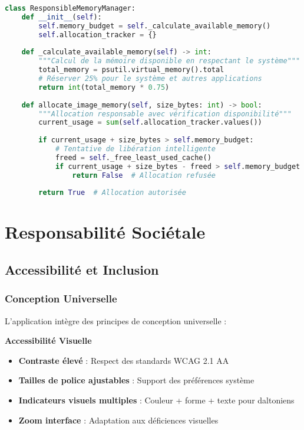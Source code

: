 \documentclass[12pt,a4paper]{report}
\begin{document}
\begin{lstlisting}[language=Python]
class ResponsibleMemoryManager:
    def __init__(self):
        self.memory_budget = self._calculate_available_memory()
        self.allocation_tracker = {}
        
    def _calculate_available_memory(self) -> int:
        """Calcul de la mémoire disponible en respectant le système"""
        total_memory = psutil.virtual_memory().total
        # Réserver 25% pour le système et autres applications
        return int(total_memory * 0.75)
    
    def allocate_image_memory(self, size_bytes: int) -> bool:
        """Allocation responsable avec vérification disponibilité"""
        current_usage = sum(self.allocation_tracker.values())
        
        if current_usage + size_bytes > self.memory_budget:
            # Tentative de libération intelligente
            freed = self._free_least_used_cache()
            if current_usage + size_bytes - freed > self.memory_budget:
                return False  # Allocation refusée
        
        return True  # Allocation autorisée
\end{lstlisting}

\section{Responsabilité Sociétale}

\subsection{Accessibilité et Inclusion}

\subsubsection{Conception Universelle}

L'application intègre des principes de conception universelle :

\textbf{Accessibilité Visuelle}
\begin{itemize}
\item \textbf{Contraste élevé} : Respect des standards WCAG 2.1 AA
\item \textbf{Tailles de police ajustables} : Support des préférences système
\item \textbf{Indicateurs visuels multiples} : Couleur + forme + texte pour daltoniens
\item \textbf{Zoom interface} : Adaptation aux déficiences visuelles
\end{itemize}
\end{document}
